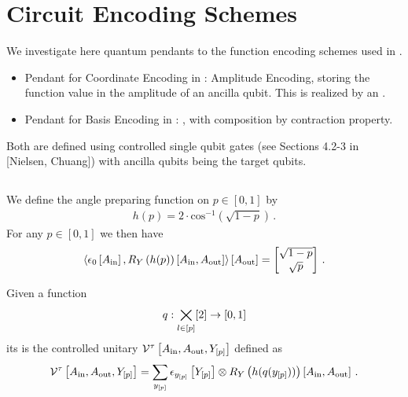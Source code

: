 \section{Circuit Encoding Schemes}

We investigate here quantum pendants to the function encoding schemes used in \tnreason{}{}.

\begin{itemize}
    \item Pendant for Coordinate Encoding in \tnreason{}: Amplitude Encoding, storing the function value in the amplitude of an ancilla qubit.
    This is realized by an \textbf{\ActivationCircuit{}}.
    \item Pendant for Basis Encoding in \tnreason{}: \textbf{\ComputationCircuit{}}, with composition by contraction property.
\end{itemize}

Both are defined using controlled single qubit gates (see Sections 4.2-3 in [Nielsen, Chuang]) with ancilla qubits being the target qubits. %

\subsection{\ActivationCircuit{}}


We define the angle preparing function on $p\in[0,1]$ by
\begin{align*}
    h(p) = 2 \cdot \mathrm{cos}^{-1}\left(\sqrt{1-p}\right) \, .
\end{align*}
For any $p\in[0,1]$ we then have
\begin{align*}
    \left\langle \epsilon_{0}\left[A_{\mathrm{in}}\right],R_Y\left({h(p)}\right)\left[A_{\mathrm{in}},A_{\mathrm{out}}\right]\right\rangle \left[ A_{\mathrm{out}} \right]
    = \begin{bmatrix}
          \sqrt{1-p} \\
          \sqrt{p}
    \end{bmatrix} \, .
\end{align*}

\begin{definition}[\ActivationCircuit{}]
    Given a function
    \begin{align*}
        q : \bigtimes_{l\in[p]} [2] \rightarrow [0,1]
    \end{align*}
    its \activationCircuit{} is the controlled unitary
    $\mathcal{V}^{\tau}\left[A_{\mathrm{in}},A_{\mathrm{out}},Y_{[p]}\right]$ defined as
    \begin{align*}
        \mathcal{V}^{\tau}\left[A_{\mathrm{in}},A_{\mathrm{out}},Y_{[p]}\right]
        = \sum_{y_{[p]}} \epsilon_{y_{[p]}}\left[Y_{[p]}\right]
        \otimes R_Y\left({h(q(y_{[p]}))}\right)\left[A_{\mathrm{in}},A_{\mathrm{out}}\right] \, .
    \end{align*}
\end{definition}

